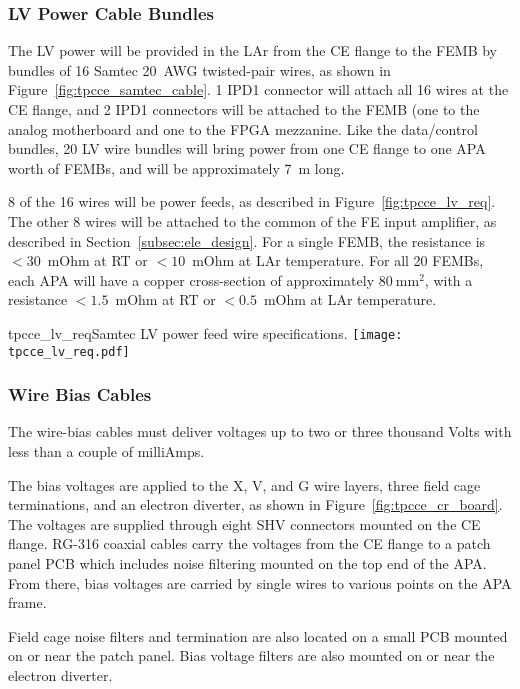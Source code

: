 \subsubsection{LV Power Cable Bundles}
\label{subsubsec:ce_lvpower_cable}

The LV power will be provided in the LAr from the CE flange to the FEMB by bundles of 16 Samtec 
20~AWG twisted-pair wires, as shown in Figure~\ref{fig:tpcce_samtec_cable}. 1 IPD1 connector will
attach all 16 wires at the CE flange, and 2 IPD1 connectors will be attached to the FEMB (one to the
analog motherboard and one to the FPGA mezzanine. Like the data/control bundles, 20 LV wire bundles 
will bring power from one CE flange to one APA worth of FEMBs, and will be approximately 7~m long.

8 of the 16 wires will be power feeds, as described in Figure~\ref{fig:tpcce_lv_req}. The other 8 wires
will be attached to the common of the FE input amplifier, as described in Section~\ref{subsec:ele_design}. For
a single FEMB, the resistance is $<30$~mOhm at RT or $<10$~mOhm at LAr temperature. For
all 20 FEMBs, each APA will have a copper cross-section of approximately $80~\mathrm{mm}^2$, with
a resistance $<1.5$~mOhm at RT or $<0.5$~mOhm at LAr temperature.

\begin{cdrfigure}{tpcce_lv_req}{Samtec LV power feed wire 
specifications.}
\texttt{[image: tpcce\_lv\_req.pdf]}
\end{cdrfigure}

\subsubsection{Wire Bias Cables}
\label{subsubsec:ce_bias_cable}

The wire-bias cables must deliver voltages up to two or three thousand Volts with less than a 
couple of milliAmps.

The bias voltages are applied to the X, V, and G wire layers, three field cage terminations, 
and an electron diverter, as shown in Figure~\ref{fig:tpcce_cr_board}. The voltages are supplied 
through eight SHV connectors mounted on the CE flange. RG-316 coaxial cables carry the voltages 
from the CE flange to a patch panel PCB which includes noise filtering mounted on the top 
end of the APA. From there, bias voltages are carried by single wires to 
various points on the APA frame.

Field cage noise filters and termination are also located on a small PCB mounted on or near 
the patch panel. Bias voltage filters are also mounted on or near the electron diverter.


